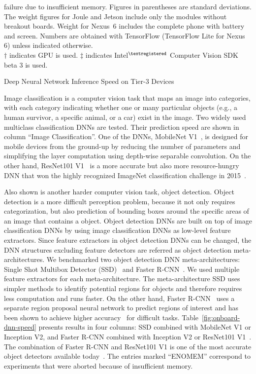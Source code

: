 \begin{table}
\begin{captiontext}
        failure due to insufficient memory. Figures in parentheses are standard
        deviations. The weight figures for Joule and Jetson include only the modules
        without breakout boards. Weight for Nexus~6 includes the complete phone with
        battery and screen. Numbers are obtained with TensorFlow (TensorFlow Lite for
        Nexus 6) unless indicated otherwise. \\
        $\dagger$ indicates GPU is used. $\ddagger$ indicates
        Intel$^{\tiny\textregistered}$ Computer Vision SDK beta 3 is used.
    \end{captiontext}
    \caption{Deep Neural Network Inference Speed on Tier-3 Devices}
    \label{fig:onboard-dnn-speed}
\end{table}

Image classification is a computer vision task that maps an image into
categories, with each category indicating whether one or many particular objects
(e.g., a human survivor, a specific animal, or a car) exist in the image. Two
widely used multiclass classification DNNs are tested. Their prediction speed
are shown in column ``Image Classification''. One of the DNNs, MobileNet
V1~\cite{Howard2017}, is designed for mobile devices from the ground-up by
reducing the number of parameters and simplifying the layer computation using
depth-wise separable convolution. On the other hand, ResNet101 V1~\cite{He2016}
is a more accurate but also more resource-hungry DNN that won the highly
recognized ImageNet classification challenge in 2015~\cite{Russakovsky15}.

Also shown is another harder computer vision task, object detection. Object
detection is a more difficult perception problem, because it not only requires
categorization, but also prediction of bounding boxes around the specific areas
of an image that contains a object. Object detection DNNs
are built on top of image classification DNNs by using image classification DNNs
as low-level feature extractors. Since feature extractors in object detection
DNNs can be changed, the DNN structures excluding feature detectors are referred
as object detection meta-architectures. We benchmarked two object detection DNN
meta-architectures: Single Shot Multibox Detector (SSD)~\cite{Liu2016} and
Faster R-CNN~\cite{Ren2015}. We used multiple feature extractors for each
meta-architecture. The meta-architecture SSD uses simpler methods to identify
potential regions for objects and therefore requires less computation and runs
faster. On the other hand, Faster R-CNN~\cite{Ren2015} uses a separate region
proposal neural network to predict regions of interest and has been shown to
achieve higher accuracy~\cite{Huang2017} for difficult tasks.
Table~\ref{fig:onboard-dnn-speed} presents results in four columns: SSD
combined with MobileNet V1 or Inception V2, and Faster R-CNN combined with
Inception V2 or ResNet101 V1~\cite{He2016}. The combination of Faster R-CNN and
ResNet101 V1 is one of the most accurate object detectors available
today~\cite{Russakovsky15}. The entries marked ``{\sc ENOMEM}'' correspond to
experiments that were aborted because of insufficient memory.

